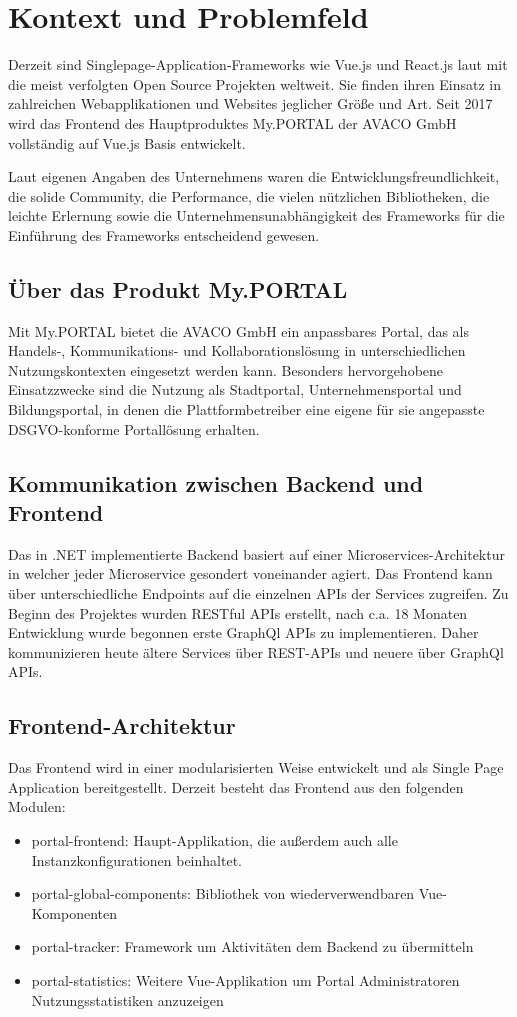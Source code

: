 \chapter{Kontext und Problemfeld}
\label{cha:Problemfeld und Kontext}
 
Derzeit sind Singlepage-Application-Frameworks wie Vue.js und React.js laut \citeauthor{GithubStarSearch} mit die meist verfolgten Open Source Projekten weltweit. Sie finden ihren Einsatz in zahlreichen Webapplikationen und Websites jeglicher Größe und Art. Seit 2017 wird das Frontend des Hauptproduktes My.PORTAL der AVACO GmbH vollständig auf Vue.js Basis entwickelt.
 
Laut eigenen Angaben des Unternehmens waren die Entwicklungsfreundlichkeit, die solide Community, die Performance, die vielen nützlichen Bibliotheken, die leichte Erlernung sowie die Unternehmensunabhängigkeit des Frameworks für die Einführung des Frameworks entscheidend gewesen.
 
\section{Über das Produkt My.PORTAL}
Mit My.PORTAL bietet die AVACO GmbH ein anpassbares Portal, das als Handels-,
Kommunikations- und Kollaborationslösung in unterschiedlichen Nutzungskontexten eingesetzt werden kann. Besonders hervorgehobene Einsatzzwecke sind die Nutzung als Stadtportal, Unternehmensportal und Bildungsportal, in denen die Plattformbetreiber eine eigene für sie angepasste DSGVO-konforme Portallösung erhalten.
 
\section{Kommunikation zwischen Backend und Frontend}
Das in .NET implementierte Backend basiert auf einer Microservices-Architektur in welcher jeder Microservice gesondert voneinander agiert. Das Frontend kann über unterschiedliche Endpoints auf die einzelnen APIs der Services zugreifen. Zu Beginn des Projektes wurden RESTful APIs erstellt, nach c.a. 18 Monaten Entwicklung wurde begonnen erste GraphQl APIs zu implementieren. Daher kommunizieren heute ältere Services über REST-APIs und neuere über GraphQl APIs.
 
\section{Frontend-Architektur}
Das Frontend wird in einer modularisierten Weise entwickelt und als Single Page Application bereitgestellt. Derzeit besteht das Frontend aus den folgenden Modulen:
\begin{itemize}
 \item portal-frontend: Haupt-Applikation, die außerdem auch alle Instanzkonfigurationen beinhaltet.
 \item portal-global-components: Bibliothek von wiederverwendbaren Vue-Komponenten
 \item portal-tracker: Framework um Aktivitäten dem Backend zu übermitteln
 \item portal-statistics: Weitere Vue-Applikation um Portal Administratoren Nutzungsstatistiken anzuzeigen
\end{itemize}
 
